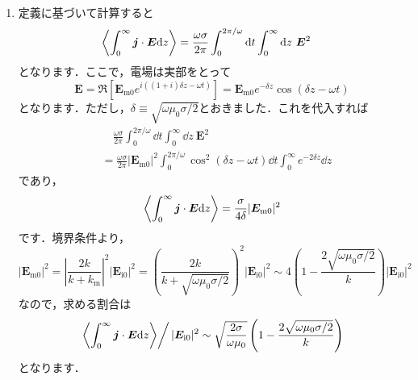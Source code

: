 \documentclass[a4paper,pdflatex,ja=standard]{bxjsarticle}
\begin{document}
\begin{enumerate}
  \item 
  
  定義に基づいて計算すると
  \begin{align}
    \ev{
      \int_0^{\infty}
      \bm{j}\cdot\bm{E}
      \dd z
    }
    &=
    \frac{\omega\sigma}{2\pi}
    \int_{0}^{2\pi/\omega}
    \dd t
    \int_{0}^{\infty}
    \dd z\ 
    \bm{E}^2
  \end{align}
  となります．ここで，電場は実部をとって
  \begin{equation}
    \bm{E}
    =
    \Re\left[  
      \bm{E}_{\mathrm{m}0}e^{i((1+i)\delta z-\omega t)}
    \right]
    =
    \bm{E}_{\mathrm{m}0}e^{-\delta z}
    \cos(\delta z-\omega t)
  \end{equation}
  となります．ただし，$\delta\equiv\sqrt{\omega\mu_0\sigma/2}$とおきました．これを代入すれば 
  \begin{align}    
    &\quad
    \frac{\omega\sigma}{2\pi}
    \int_{0}^{2\pi/\omega}
    \dd t
    \int_{0}^{\infty}
    \dd z\ 
    \bm{E}^2
    \nonumber
    \\
    &=
    \frac{\omega\sigma}{2\pi}|\bm{E}_{\mathrm{m}0}|^2
    \int_0^{2\pi/\omega}
    \cos^2(\delta z-\omega t)
    \dd t
    \int_0^{\infty}
    e^{-2\delta z}
    \dd z
  \end{align}
  であり，
  \begin{equation}
    \ev{
      \int_0^{\infty}
      \bm{j}\cdot\bm{E}
      \dd z
    }
    =    
    \frac{\sigma}{4\delta}|\bm{E}_{\mathrm{m}0}|^2
  \end{equation}
  です．境界条件より，
  \begin{equation}
    |\bm{E}_{\mathrm{m}0}|^2
    =
    \left|
      \frac{2k}{k+k_{\mathrm{m}}}
    \right|^2
    |\bm{E}_{\mathrm{i}0}|^2
    =
    \left(  
      \frac{2k}{k+\sqrt{\omega\mu_0\sigma/2}}
    \right)^2
    |\bm{E}_{\mathrm{i}0}|^2
    \sim
    4\left( 1-\frac{2\sqrt{\omega\mu_0\sigma/2}}{k} \right)
    |\bm{E}_{\mathrm{i}0}|^2    
  \end{equation}
  なので，求める割合は
  \begin{equation}
    \left.
    \ev{
      \int_0^{\infty}
      \bm{j}\cdot\bm{E}
      \dd z
    }
    \right/
    |\bm{E}_{\mathrm{i}0}|^2    
    \sim
    \sqrt{\frac{2\sigma}{\omega\mu_0}}
    \left(  
      1
      -
      \frac{2\sqrt{\omega\mu_0\sigma/2}}{k}
    \right)
  \end{equation}
  となります．


\end{enumerate}
\end{document}
